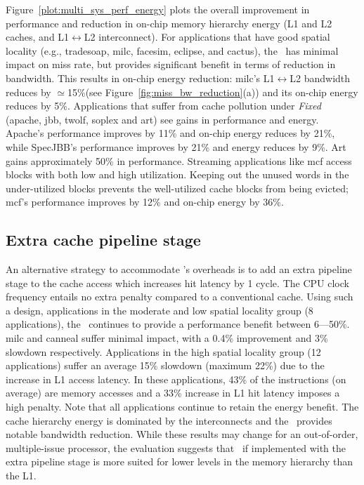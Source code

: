 {{Figure~\ref{plot:multi_sys_perf_energy} plots the overall improvement in performance and reduction in on-chip memory hierarchy energy (L1 and L2 caches, and L1$\leftrightarrow$L2 interconnect). For applications that have good spatial locality (e.g., tradesoap, milc, facesim, eclipse, and cactus), the \AC\ has minimal impact on miss rate, but provides significant benefit in terms of reduction in bandwidth. This results in on-chip energy reduction: milc's L1$\leftrightarrow$L2 bandwidth reduces by $\simeq$15\%(see Figure~\ref{fig:miss_bw_reduction}(a)) and its on-chip energy reduces by 5\%. Applications that suffer from cache pollution under \textit{Fixed} (apache, jbb, twolf, soplex and art) see gains in performance and energy. Apache's performance improves by 11\% and on-chip energy reduces by 21\%, while SpecJBB's performance improves by 21\% and energy reduces by 9\%. Art gains approximately 50\% in performance.  Streaming applications like mcf access blocks with both low and high utilization. Keeping out the unused words in the under-utilized blocks prevents the well-utilized cache blocks from being evicted; mcf's performance improves by 12\% and on-chip energy by 36\%.

\subsection{Extra cache pipeline stage}
\label{sec:extra_cache_pipeline_stage}

An alternative strategy to accommodate \AC{}'s overheads is to add an extra pipeline stage to the cache access which increases hit latency by 1 cycle. The CPU clock frequency entails no extra penalty compared to a conventional cache. Using such a design, applications in the moderate and low spatial locality group (8 applications), the \AC\ continues to provide a performance benefit between 6---50\%. milc and canneal suffer minimal impact, with a 0.4\% improvement and 3\% slowdown respectively.  Applications in the high spatial locality group (12 applications) suffer an average 15\% slowdown (maximum 22\%) due to the increase in L1 access latency. In these applications, 43\% of the instructions (on average) are memory accesses and a 33\% increase in L1 hit latency imposes a high penalty. Note that all applications continue to retain the energy benefit. The cache hierarchy energy is dominated by the interconnects and the \AC\ provides notable bandwidth reduction. While these results may change for an out-of-order, multiple-issue processor, the evaluation suggests that \AC\ if implemented with the extra pipeline stage is more suited for lower levels in the memory hierarchy than the L1.  

}}
